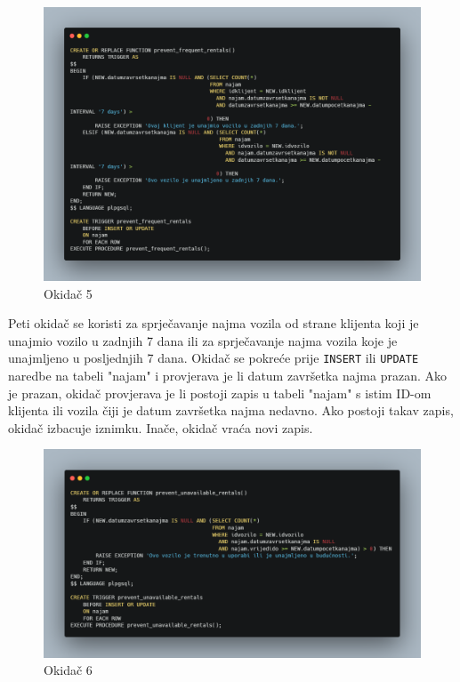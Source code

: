 \documentclass[]{foi} %
\begin{document}
\begin{figure}[!ht]
    \centering
    \includegraphics[width=1\textwidth]{slike/5.png}
    \caption{Okidač 5}
    \label{fig:peti}
\end{figure}

Peti okidač se koristi za sprječavanje najma vozila od strane klijenta koji je unajmio vozilo u zadnjih 7 dana ili za sprječavanje najma vozila koje je unajmljeno u posljednjih 7 dana. Okidač se pokreće prije \texttt{INSERT} ili \texttt{UPDATE} naredbe na tabeli "najam" i provjerava je li datum završetka najma prazan. Ako je prazan, okidač provjerava je li postoji zapis u tabeli "najam" s istim ID-om klijenta ili vozila čiji je datum završetka najma nedavno. Ako postoji takav zapis, okidač izbacuje iznimku. Inače, okidač vraća novi zapis.
\newpage

\begin{figure}[!ht]
    \centering
    \includegraphics[width=1\textwidth]{slike/6.png}
    \caption{Okidač 6}
    \label{fig:sesti}
\end{figure}
\end{document}

